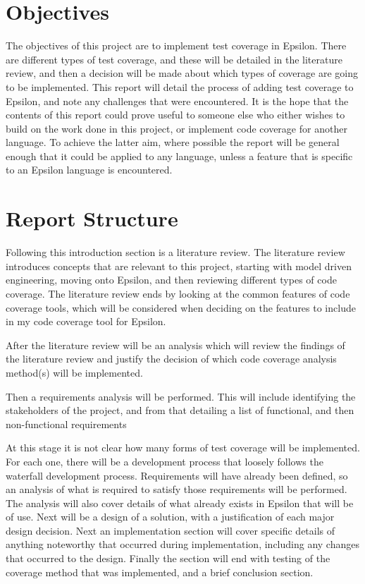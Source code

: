 \section{Objectives}

The objectives of this project are to implement test coverage in Epsilon. There are different types of test coverage, and these will be detailed in the literature review, and then a decision will be made about which types of coverage are going to be implemented. This report will detail the process of adding test coverage to Epsilon, and note any challenges that were encountered. It is the hope that the contents of this report could prove useful to someone else who either wishes to build on the work done in this project, or implement code coverage for another language. To achieve the latter aim, where possible the report will be general enough that it could be applied to any language, unless a feature that is specific to an Epsilon language is encountered.

\section{Report Structure}

Following this introduction section is a literature review. The literature review introduces concepts that are relevant to this project, starting with model driven engineering, moving onto Epsilon, and then reviewing different types of code coverage. The literature review ends by looking at the common features of code coverage tools, which will be considered when deciding on the features to include in my code coverage tool for Epsilon.

After the literature review will be an analysis which will review the findings of the literature review and justify the decision of which code coverage analysis method(s) will be implemented.

Then a requirements analysis will be performed. This will include identifying the stakeholders of the project, and from that detailing a list of functional, and then non-functional requirements

At this stage it is not clear how many forms of test coverage will be implemented. For each one, there will be a development process that loosely follows the waterfall development process. Requirements will have already been defined, so an analysis of what is required to satisfy those requirements will be performed. The analysis will also cover details of what already exists in Epsilon that will be of use. Next will be a design of a solution, with a justification of each major design decision. Next an implementation section will cover specific details of anything noteworthy that occurred during implementation, including any changes that occurred to the design. Finally the section will end with testing of the coverage method that was implemented, and a brief conclusion section.

